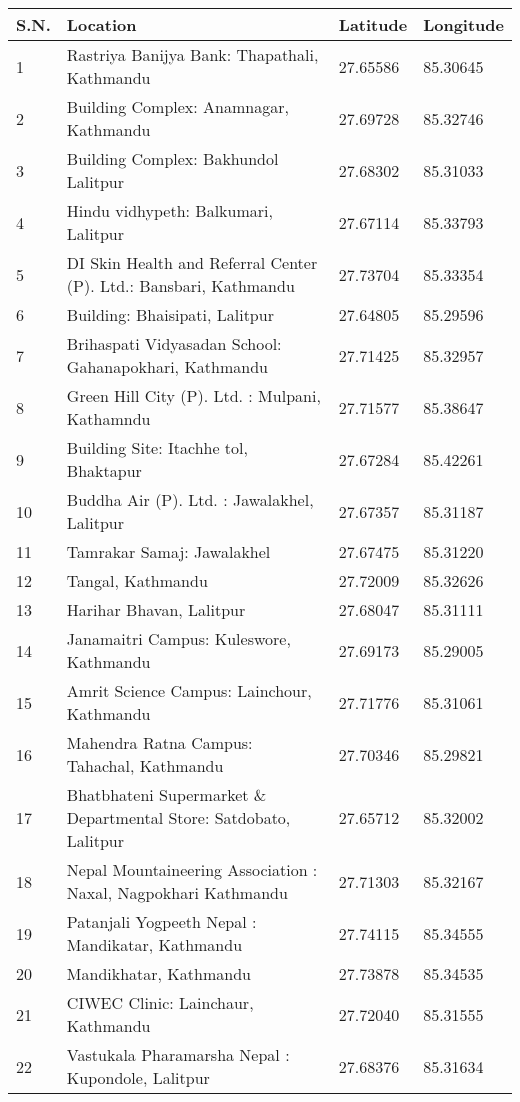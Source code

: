 \begin{tabularx}{\textwidth}{ | l | p{} | X | X | }
\hline
 \textbf{S.N.} & \textbf{Location} & \textbf{Latitude} & \textbf{Longitude} \\
\hline
 1 & Rastriya Banijya Bank: Thapathali, Kathmandu & 27.65586 & 85.30645 \\
 2 & Building Complex: Anamnagar, Kathmandu & 27.69728 & 85.32746 \\
 3 & Building Complex: Bakhundol Lalitpur & 27.68302 & 85.31033 \\
 4 & Hindu vidhypeth: Balkumari, Lalitpur & 27.67114 & 85.33793 \\
 5 & DI Skin Health and Referral Center (P). Ltd.: Bansbari, Kathmandu & 27.73704 & 85.33354 \\
 6 & Building: Bhaisipati, Lalitpur & 27.64805 & 85.29596 \\
 7 & Brihaspati Vidyasadan School: Gahanapokhari, Kathmandu & 27.71425 & 85.32957 \\
 8 & Green Hill City (P). Ltd. : Mulpani, Kathamndu  & 27.71577 & 85.38647 \\
 9 & Building Site: Itachhe tol, Bhaktapur & 27.67284 & 85.42261 \\
 10 & Buddha Air (P). Ltd. : Jawalakhel, Lalitpur  & 27.67357 & 85.31187 \\
 11 & Tamrakar Samaj: Jawalakhel & 27.67475 & 85.31220 \\
 12 & Tangal, Kathmandu & 27.72009 & 85.32626 \\
 13 & Harihar Bhavan, Lalitpur & 27.68047 & 85.31111 \\
 14 & Janamaitri Campus: Kuleswore, Kathmandu & 27.69173 & 85.29005 \\
 15 & Amrit Science Campus: Lainchour, Kathmandu & 27.71776 & 85.31061 \\
 16 & Mahendra Ratna Campus: Tahachal, Kathmandu & 27.70346 & 85.29821 \\
 17 & Bhatbhateni Supermarket \& Departmental Store: Satdobato, Lalitpur & 27.65712 & 85.32002 \\
 18 & Nepal Mountaineering Association :  Naxal, Nagpokhari Kathmandu  & 27.71303 & 85.32167 \\
 19 & Patanjali Yogpeeth Nepal : Mandikatar, Kathmandu  & 27.74115 & 85.34555 \\
 20 & Mandikhatar, Kathmandu  & 27.73878 & 85.34535 \\
 21 & CIWEC Clinic: Lainchaur, Kathmandu  & 27.72040 & 85.31555 \\
 22 & Vastukala Pharamarsha Nepal : Kupondole, Lalitpur & 27.68376 & 85.31634 \\

\end{tabularx}

